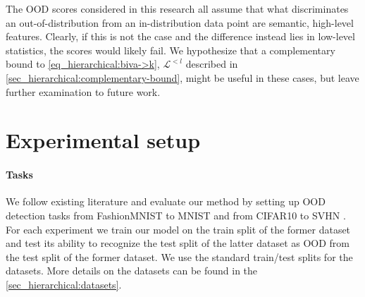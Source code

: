 {The OOD scores considered in this research all assume that what discriminates an out-of-distribution from an in-distribution data point are semantic, high-level features. Clearly, if this is not the case and the difference instead lies in low-level statistics, the scores would likely fail. We hypothesize that a complementary bound to \cref{eq_hierarchical:biva->k}, $\mathcal{L}^{<l}$ described in \cref{sec_hierarchical:complementary-bound}, might be useful in these cases, but leave further examination to future work.


\section{Experimental setup}

\paragraph{Tasks} We follow existing literature \parencite{nalisnick_deep_2019, hendrycks_deep_2019} and evaluate our method by setting up OOD detection tasks from FashionMNIST \parencite{xiao_fashionmnist_2017} to MNIST \parencite{lecun_gradientbased_1998} and from CIFAR10 \parencite{krizhevsky_learning_2009} to SVHN \parencite{netzer_reading_2011}.
For each experiment we train our model on the train split of the former dataset and test its ability to recognize the test split of the latter dataset as OOD from the test split of the former dataset.
We use the standard train/test splits for the datasets.
More details on the datasets can be found in the \cref{sec_hierarchical:datasets}.


\begin{figure}
    \centering
\end{figure}}
